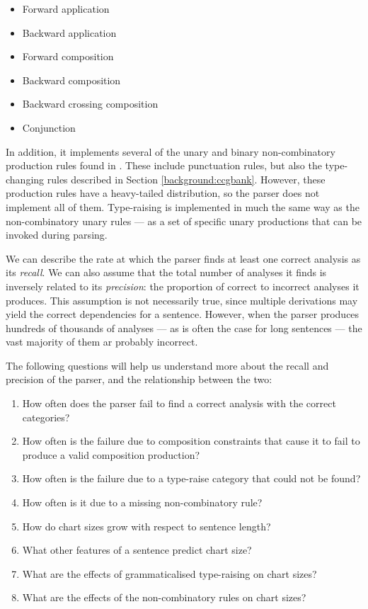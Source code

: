 \begin{itemize}
 \item Forward application
 \item Backward application
 \item Forward composition
 \item Backward composition
 \item Backward crossing composition
 \item Conjunction
\end{itemize}

In addition, it implements several of the unary and binary non-combinatory production rules found in \ccgbank. These include punctuation rules, but also the type-changing rules described in Section \ref{background:ccgbank}. However, these production rules have a heavy-tailed distribution, so the parser does not implement all of them. Type-raising is implemented in much the same way as the non-combinatory unary rules --- as a set of specific unary productions that can be invoked during parsing.

We can describe the rate at which the parser finds at least one correct analysis as its \emph{recall}. We can also assume that the total number of analyses it finds is inversely related to its \emph{precision}: the proportion of correct to incorrect analyses it produces. This assumption is not necessarily true, since multiple \ccg derivations may yield the correct dependencies for a sentence. However, when the parser produces hundreds of thousands of analyses --- as is often the case for long sentences --- the vast majority of them ar probably incorrect.

The following questions will help us understand more about the recall and precision of the parser, and the relationship between the two:

\begin{enumerate}
 \item How often does the parser fail to find a correct analysis with the correct categories?
 \item How often is the failure due to composition constraints that cause it to fail to produce a valid composition production?
 \item How often is the failure due to a type-raise category that could not be found?
 \item How often is it due to a missing non-combinatory rule?
 \item How do chart sizes grow with respect to sentence length?
 \item What other features of a sentence predict chart size?
 \item What are the effects of grammaticalised type-raising on chart sizes?
 \item What are the effects of the non-combinatory rules on chart sizes?
\end{enumerate}

